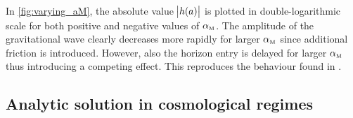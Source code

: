 \documentclass[12pt,parskip=half]{scrreprt}
\begin{document}

In \autoref{fig:varying_aM}, the absolute value \(\abs{h(a)}\) is plotted in double-logarithmic scale  for both positive and negative values of \({\alpha_{\textnormal{\tiny{M}}}}\). The amplitude of the gravitational wave clearly decreases more rapidly for larger \({\alpha_{\textnormal{\tiny{M}}}}\) since additional friction is introduced. However, also the horizon entry is delayed for larger \({\alpha_{\textnormal{\tiny{M}}}}\) thus introducing a competing effect.  This reproduces the behaviour found in \cite{Pettorino2014}. 


\subsection{Analytic solution in cosmological regimes}
\end{document}
